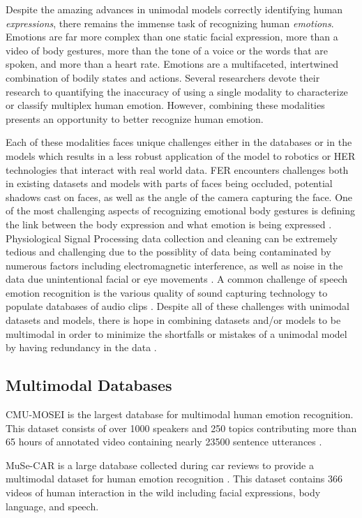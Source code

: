 Despite the amazing advances in unimodal models correctly identifying human \textit{expressions}, there remains the immense task of recognizing human \textit{emotions}. Emotions are far more complex than one static facial expression, more than a video of body gestures, more than the tone of a voice or the words that are spoken, and more than a heart rate. Emotions are a multifaceted, intertwined combination of bodily states and actions. Several researchers \cite{cabitza-2022} devote their research to quantifying the inaccuracy of using a single modality to characterize or classify multiplex human emotion. However, combining these modalities presents an opportunity to better recognize human emotion.

Each of these modalities faces unique challenges either in the databases or in the models which results in a less robust application of the model to robotics or HER technologies that interact with real world data. FER encounters challenges both in existing datasets and models with parts of faces being occluded, potential shadows cast on faces, as well as the angle of the camera capturing the face. One of the most challenging aspects of recognizing emotional body gestures is defining the link between the body expression and what emotion is being expressed \cite{noroozi-2021}. Physiological Signal Processing data collection and cleaning can be extremely tedious and challenging due to the possiblity of data being contaminated by numerous factors including electromagnetic interference, as well as noise in the data due unintentional facial or eye movements \cite{ahmad-2022}. A common challenge of speech emotion recognition is the various quality of sound capturing technology to populate databases of audio clips \cite{zong-2022}. Despite all of these challenges with unimodal datasets and models, there is hope in combining datasets and/or models to be multimodal in order to minimize the shortfalls or mistakes of a unimodal model by having redundancy in the data \cite{cid-2015}. 

\subsection{Multimodal Databases}
    CMU-MOSEI is the largest database for multimodal human emotion recognition. This dataset consists of over 1000 speakers and 250 topics contributing more than 65 hours of annotated video containing nearly 23500 sentence utterances \cite{zadeh-2018}.
    
    MuSe-CAR is a large database collected during car reviews to provide a multimodal dataset for human emotion recognition \cite{stappen-2021}. This dataset contains 366 videos of human interaction in the wild including facial expressions, body language, and speech. 

